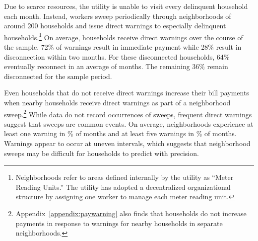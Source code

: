 \documentclass[12pt]{article}
\begin{document}
Due to scarce resources, the utility is unable to visit every delinquent household each month.  Instead, workers sweep periodically through neighborhoods of around 200 households and issue direct warnings to especially delinquent households.\footnote{Neighborhoods refer to areas defined internally by the utility as ``Meter Reading Units.''  The utility has adopted a decentralized organizational structure by assigning one worker to manage each meter reading unit.} On average, households receive direct warnings over the course of the sample.  72\% of warnings result in immediate payment while 28\% result in disconnection within two months.  For these disconnected households, 64\% eventually reconnect in an average of months.  The remaining 36\% remain disconnected for the sample period.

Even households that do not receive direct warnings increase their bill payments when nearby households receive direct warnings as part of a neighborhood sweep.\footnote{Appendix~\ref{appendix:paywarning} also finds that households do not increase payments in response to warnings for nearby households in separate neighborhoods.}  While data do not record occurrences of sweeps, frequent direct warnings suggest that sweeps are common events.  On average, neighborhoods experience at least one warning in \unskip\% of months and at least five warnings in \unskip\% of months.  Warnings appear to occur at uneven intervals, which suggests that neighborhood sweeps may be difficult for households to predict with precision.






\end{document}
